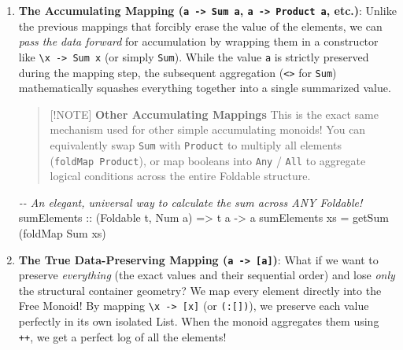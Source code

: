 \documentclass[
]{article}
\newenvironment{Shaded}{}{}
\newcommand{\CommentTok}[1]{\textcolor[rgb]{0.38,0.63,0.69}{\textit{#1}}}
\newcommand{\DataTypeTok}[1]{\textcolor[rgb]{0.56,0.13,0.00}{#1}}
\newcommand{\FunctionTok}[1]{\textcolor[rgb]{0.02,0.16,0.49}{#1}}
\newcommand{\NormalTok}[1]{#1}
\newcommand{\OtherTok}[1]{\textcolor[rgb]{0.00,0.44,0.13}{#1}}
\begin{document}
\begin{enumerate}
  \begin{quote}
  {[}!NOTE{]} \textbf{Other Constant Mappings} The power of this pattern
  is that you can swap out the monoid! If you instead mapped
  \texttt{\textbackslash{}x\ -\textgreater{}\ Any\ True}, the
  aggregation calculates whether the structure is non-empty
  (\texttt{not\ .\ null}). If you map
  \texttt{\textbackslash{}x\ -\textgreater{}\ Product\ 2}, it calculates
  \(2^{\text{length}}\) (the number of possible subsets). The behavior
  is purely dictated by the monoid!
  \end{quote}
\item
  \textbf{The Accumulating Mapping (\texttt{a\ -\textgreater{}\ Sum\ a},
  \texttt{a\ -\textgreater{}\ Product\ a}, etc.)}: Unlike the previous
  mappings that forcibly erase the value of the elements, we can
  \emph{pass the data forward} for accumulation by wrapping them in a
  constructor like \texttt{\textbackslash{}x\ -\textgreater{}\ Sum\ x}
  (or simply \texttt{Sum}). While the value \texttt{a} is strictly
  preserved during the mapping step, the subsequent aggregation
  (\texttt{\textless{}\textgreater{}} for \texttt{Sum}) mathematically
  squashes everything together into a single summarized value.

  \begin{quote}
  {[}!NOTE{]} \textbf{Other Accumulating Mappings} This is the exact
  same mechanism used for other simple accumulating monoids! You can
  equivalently swap \texttt{Sum} with \texttt{Product} to multiply all
  elements (\texttt{foldMap\ Product}), or map booleans into
  \texttt{Any} / \texttt{All} to aggregate logical conditions across the
  entire Foldable structure.
  \end{quote}

\begin{Shaded}
\begin{Highlighting}[]
\CommentTok{{-}{-} An elegant, universal way to calculate the sum across ANY Foldable!}
\OtherTok{sumElements ::}\NormalTok{ (}\DataTypeTok{Foldable}\NormalTok{ t, }\DataTypeTok{Num}\NormalTok{ a) }\OtherTok{=\textgreater{}}\NormalTok{ t a }\OtherTok{{-}\textgreater{}}\NormalTok{ a}
\NormalTok{sumElements xs }\OtherTok{=}\NormalTok{ getSum (}\FunctionTok{foldMap} \DataTypeTok{Sum}\NormalTok{ xs)}
\end{Highlighting}
\end{Shaded}
\item
  \textbf{The True Data-Preserving Mapping
  (\texttt{a\ -\textgreater{}\ {[}a{]}})}: What if we want to preserve
  \emph{everything} (the exact values and their sequential order) and
  lose \emph{only} the structural container geometry? We map every
  element directly into the Free Monoid! By mapping
  \texttt{\textbackslash{}x\ -\textgreater{}\ {[}x{]}} (or
  \texttt{(:{[}{]})}), we preserve each value perfectly in its own
  isolated List. When the monoid aggregates them using \texttt{++}, we
  get a perfect log of all the elements!


\end{enumerate}
\end{document}
